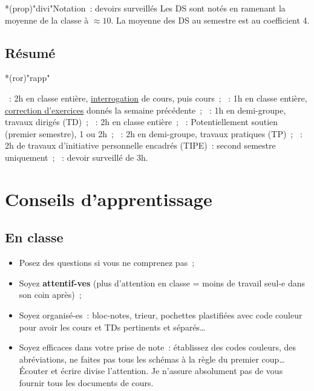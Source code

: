 \documentclass[10pt, garamond]{book}
\begin{document}
\begin{tcb}*(prop)"divi"{Notation~: devoirs surveillés}
	Les DS sont notés en ramenant la moyenne de la classe à $\approx 10$. La
	moyenne des DS au semestre est au coefficient 4.
\end{tcb}

\subsection{Résumé}
\begin{tcb}*(ror)"rapp"{}
	\begin{itemize}[label=$\diamond$, leftmargin=10pt]
		~: 2h en classe entière, \ul{interrogation} de
		cours, puis cours~;
		~: 1h en classe entière, \ul{correction
			d'exercices}
		donnés la semaine précédente~;
		~: 1h en demi-groupe, travaux dirigés (TD)~;
		~: 2h en classe entière~;
		~: Potentiellement soutien (premier semestre), 1
		ou 2h~;
		~: 2h en demi-groupe, travaux pratiques (TP)~;
		~: 2h de travaux d'initiative personnelle
		encadrés (TIPE)~: second semestre uniquement~;
		~: devoir surveillé de 3h.
	\end{itemize}
\end{tcb}

\section{Conseils d'apprentissage}

\subsection{En classe}
\begin{itemize}
	\item Posez des questions si vous ne comprenez pas~;
	\item Soyez \textbf{attentif-ves} (plus d'attention en classe = moins de
	      travail seul-e dans son coin après)~;
	\item Soyez organisé-es~: bloc-notes, trieur, pochettes plastifiées avec
	      code couleur pour avoir les cours et TDs pertinents et séparés…
	\item Soyez efficaces dans votre prise de note~: établissez des codes
	      couleurs, des abréviations, ne faites pas tous les schémas à la règle du
	      premier coup… Écouter et écrire divise l'attention. Je n'assure
	      absolument pas de vous fournir tous les documents de cours.
\end{itemize}
\end{document}
